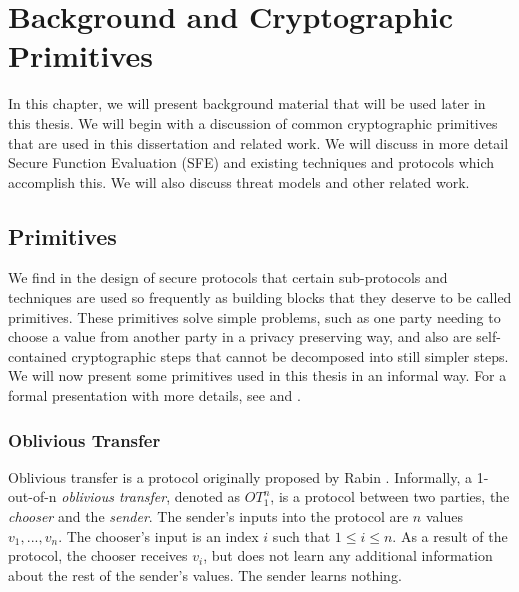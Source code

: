 
\chapter{Background and Cryptographic Primitives}

In this chapter, we will present background material that will be used
later in this thesis.  We will begin with a discussion of common
cryptographic primitives that are used in this dissertation and
related work.  We will discuss in more detail Secure Function Evaluation
(SFE) and existing techniques and protocols which accomplish this.
We will also discuss threat models and other related work.

\section{Primitives \label{sub:Primitives}}

We find in the design of secure protocols that certain sub-protocols
and techniques are used so frequently as building blocks that they
deserve to be called primitives. These primitives solve simple problems,
such as one party needing to choose a value from another party in
a privacy preserving way, and also are self-contained cryptographic
steps that cannot be decomposed into still simpler steps.
We will now present some primitives used in this thesis in an informal
way.  For a formal presentation with more details, see
\cite{GoldreichBookVol1} and \cite{Goldreich:vol2}.


\subsection{Oblivious Transfer \label{sub:Oblivious-Transfer}}

Oblivious transfer is a protocol originally proposed by Rabin \cite{Rabin81}.
Informally, a 1-out-of-n \emph{oblivious transfer}, denoted as $OT_{1}^{n}$,
is a protocol between two parties, the \emph{chooser} and the \emph{sender}.
The sender's inputs into the protocol are $n$ values $v_{1},...,v_{n}$.
The chooser's input is an index $i$ such that $1\le i\le n$. As
a result of the protocol, the chooser receives $v_{i}$, but does
not learn any additional information about the rest of the sender's
values. The sender learns nothing.

